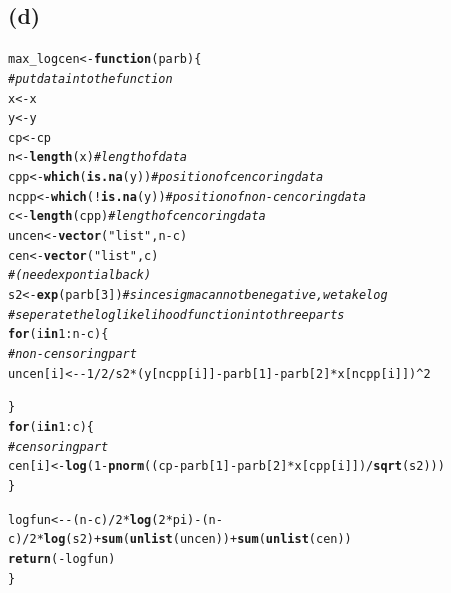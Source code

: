 \documentclass{article}\usepackage[]{graphicx}\usepackage[]{color}
\makeatletter
\newcommand{\hlnum}[1]{\textcolor[rgb]{0.686,0.059,0.569}{#1}}%
\newcommand{\hlstr}[1]{\textcolor[rgb]{0.192,0.494,0.8}{#1}}%
\newcommand{\hlcom}[1]{\textcolor[rgb]{0.678,0.584,0.686}{\textit{#1}}}%
\newcommand{\hlopt}[1]{\textcolor[rgb]{0,0,0}{#1}}%
\newcommand{\hlstd}[1]{\textcolor[rgb]{0.345,0.345,0.345}{#1}}%
\newcommand{\hlkwa}[1]{\textcolor[rgb]{0.161,0.373,0.58}{\textbf{#1}}}%
\newcommand{\hlkwb}[1]{\textcolor[rgb]{0.69,0.353,0.396}{#1}}%
\newcommand{\hlkwc}[1]{\textcolor[rgb]{0.333,0.667,0.333}{#1}}%
\newcommand{\hlkwd}[1]{\textcolor[rgb]{0.737,0.353,0.396}{\textbf{#1}}}%
\newenvironment{kframe}{%
 \def\at@end@of@kframe{}%
 \ifinner\ifhmode%
  \def\at@end@of@kframe{\end{minipage}}%
  \begin{minipage}{\columnwidth}%
 \fi\fi%
 \def\FrameCommand##1{\hskip\@totalleftmargin \hskip-\fboxsep
 \colorbox{shadecolor}{##1}\hskip-\fboxsep
     \hskip-\linewidth \hskip-\@totalleftmargin \hskip\columnwidth}%
 \MakeFramed {\advance\hsize-\width
   \@totalleftmargin\z@ \linewidth\hsize
   \@setminipage}}%
 {\par\unskip\endMakeFramed%
 \at@end@of@kframe}
\newenvironment{knitrout}{}{} %
\makeatother
\begin{document}
\subsection{(d)}
\begin{knitrout}
\color{fgcolor}\begin{kframe}
\begin{alltt}
\hlstd{max_logcen} \hlkwb{<-} \hlkwa{function}\hlstd{(}\hlkwc{parb}\hlstd{)\{}
  \hlcom{#put data into the function}
  \hlstd{x} \hlkwb{<-} \hlstd{x}
  \hlstd{y} \hlkwb{<-} \hlstd{y}
  \hlstd{cp} \hlkwb{<-} \hlstd{cp}
  \hlstd{n} \hlkwb{<-} \hlkwd{length}\hlstd{(x)} \hlcom{#length of data}
  \hlstd{cpp} \hlkwb{<-} \hlkwd{which}\hlstd{(}\hlkwd{is.na}\hlstd{(y))} \hlcom{#position of cencoring data}
  \hlstd{ncpp} \hlkwb{<-} \hlkwd{which}\hlstd{(}\hlopt{!}\hlkwd{is.na}\hlstd{(y))} \hlcom{#position of non-cencoring data}
  \hlstd{c} \hlkwb{<-} \hlkwd{length}\hlstd{(cpp)} \hlcom{#length of cencoring data}
  \hlstd{uncen} \hlkwb{<-} \hlkwd{vector}\hlstd{(}\hlstr{"list"}\hlstd{, n}\hlopt{-}\hlstd{c)}
  \hlstd{cen} \hlkwb{<-} \hlkwd{vector}\hlstd{(}\hlstr{"list"}\hlstd{, c)}
  \hlcom{#(need expontial back)}
  \hlstd{s2} \hlkwb{<-} \hlkwd{exp}\hlstd{(parb[}\hlnum{3}\hlstd{])} \hlcom{# since sigma can not be negative, we take log}
  \hlcom{#seperate the log likelihood function into three parts}
  \hlkwa{for}  \hlstd{(i} \hlkwa{in} \hlnum{1}\hlopt{:}\hlstd{n}\hlopt{-}\hlstd{c)\{}
    \hlcom{#non-censoring part}
    \hlstd{uncen[i]} \hlkwb{<-} \hlopt{-}\hlnum{1}\hlopt{/}\hlnum{2}\hlopt{/}\hlstd{s2}\hlopt{*}\hlstd{(y[ncpp[i]]}\hlopt{-}\hlstd{parb[}\hlnum{1}\hlstd{]}\hlopt{-}\hlstd{parb[}\hlnum{2}\hlstd{]}\hlopt{*}\hlstd{x[ncpp[i]])}\hlopt{^}\hlnum{2}

  \hlstd{\}}
  \hlkwa{for} \hlstd{(i} \hlkwa{in} \hlnum{1}\hlopt{:}\hlstd{c)\{}
    \hlcom{#censoring part}
    \hlstd{cen[i]} \hlkwb{<-} \hlkwd{log}\hlstd{(}\hlnum{1}\hlopt{-} \hlkwd{pnorm}\hlstd{((cp}\hlopt{-}\hlstd{parb[}\hlnum{1}\hlstd{]}\hlopt{-}\hlstd{parb[}\hlnum{2}\hlstd{]}\hlopt{*}\hlstd{x[cpp[i]])}\hlopt{/}\hlkwd{sqrt}\hlstd{(s2)))}
  \hlstd{\}}

  \hlstd{logfun} \hlkwb{<-} \hlopt{-}\hlstd{(n}\hlopt{-}\hlstd{c)}\hlopt{/}\hlnum{2}\hlopt{*}\hlkwd{log}\hlstd{(}\hlnum{2}\hlopt{*}\hlstd{pi)}\hlopt{-}\hlstd{(n}\hlopt{-}\hlstd{c)}\hlopt{/}\hlnum{2}\hlopt{*}\hlkwd{log}\hlstd{(s2)}\hlopt{+}\hlkwd{sum}\hlstd{(}\hlkwd{unlist}\hlstd{(uncen))}\hlopt{+}\hlkwd{sum}\hlstd{(}\hlkwd{unlist}\hlstd{(cen))}
  \hlkwd{return}\hlstd{(}\hlopt{-}\hlstd{logfun)}
\hlstd{\}}


\end{alltt}
\end{kframe}
\end{knitrout}
\end{document}
